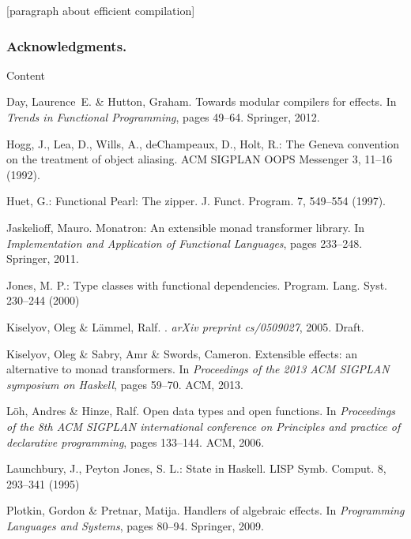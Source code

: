 \documentclass[runningheads,a4paper]{llncs}
\newcommand{\todo}[1]{[{\color{blue}#1}]}
\begin{document}
\todo{paragraph about efficient compilation}

\subsubsection*{Acknowledgments.} Content

\begin{thebibliography}{4}

Day, Laurence~E. \& Hutton, Graham.
\newblock Towards modular compilers for effects.
\newblock In \emph{Trends in Functional Programming}, pages 49--64. Springer,
  2012.

 Hogg, J., Lea, D., Wills, A., deChampeaux, D., Holt, R.: The Geneva convention on the treatment of object aliasing. ACM SIGPLAN OOPS Messenger 3, 11--16 (1992).

 Huet, G.: Functional Pearl: The zipper. J. Funct. Program. 7, 549--554 (1997).

Jaskelioff, Mauro.
\newblock Monatron: An extensible monad transformer library.
\newblock In \emph{Implementation and Application of Functional Languages},
  pages 233--248. Springer, 2011.
  
 Jones, M. P.: Type classes with functional dependencies. Program. Lang. Syst. 230--244 (2000)
  
  Kiselyov, Oleg \& L{\"a}mmel, Ralf.
  .
  \newblock \emph{arXiv preprint cs/0509027}, 2005.
  \newblock Draft.

Kiselyov, Oleg \& Sabry, Amr \& Swords, Cameron.
\newblock Extensible effects: an alternative to monad transformers.
\newblock In \emph{Proceedings of the 2013 ACM SIGPLAN symposium on Haskell},
  pages 59--70. ACM, 2013.

L{\"o}h, Andres \& Hinze, Ralf.
\newblock Open data types and open functions.
\newblock In \emph{Proceedings of the 8th ACM SIGPLAN international conference
  on Principles and practice of declarative programming}, pages 133--144. ACM,
  2006.
  
 Launchbury, J., Peyton Jones, S. L.: State in Haskell. LISP Symb. Comput. 8, 293--341 (1995)



Plotkin, Gordon \& Pretnar, Matija.
\newblock Handlers of algebraic effects.
\newblock In \emph{Programming Languages and Systems}, pages 80--94. Springer,
  2009.


\end{thebibliography}
\end{document}
